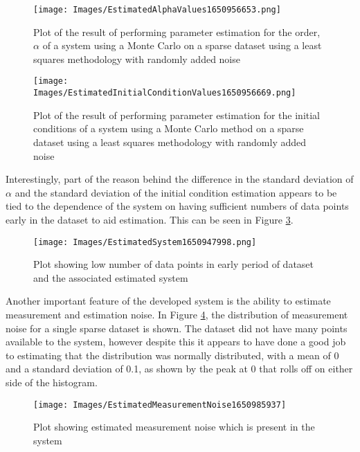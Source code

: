\begin{figure}[h]
	\centering
	\texttt{[image: Images/EstimatedAlphaValues1650956653.png]}
	\caption{Plot of the result of performing parameter estimation for the order, $\alpha$ of a system using a Monte Carlo on a sparse dataset using a least squares methodology with randomly added noise}
    \label{fig:least_squares_estimation_monte_carlo_simulation_alpha}
\end{figure}

\begin{figure}[h]
	\centering
	\texttt{[image: Images/EstimatedInitialConditionValues1650956669.png]}
	\caption{Plot of the result of performing parameter estimation for the initial conditions of a system using a Monte Carlo method on a sparse dataset using a least squares methodology with randomly added noise}
    \label{fig:least_squares_estimation_monte_carlo_simulation_x_0}
\end{figure}

Interestingly, part of the reason behind the difference in the standard deviation of $\alpha$ and the standard deviation of the initial condition estimation appears to be tied to the dependence of the system on having sufficient numbers of data points early in the dataset to aid estimation. This can be seen in Figure \ref{fig:poor_initial_condition_estimate}.

\begin{figure}[h]
	\centering
	\texttt{[image: Images/EstimatedSystem1650947998.png]}
	\caption{Plot showing low number of data points in early period of dataset and the associated estimated system}
    \label{fig:poor_initial_condition_estimate}
\end{figure}

Another important feature of the developed system is the ability to estimate measurement and estimation noise. In Figure \ref{fig:measurement_noise}, the distribution of measurement noise for a single sparse dataset is shown. The dataset did not have many points available to the system, however despite this it appears to have done a good job to estimating that the distribution was normally distributed, with a mean of 0 and a standard deviation of 0.1, as shown by the peak at 0 that rolls off on either side of the histogram. 

\begin{figure}[h]
	\centering
	\texttt{[image: Images/EstimatedMeasurementNoise1650985937]}
	\caption{Plot showing estimated measurement noise which is present in the system}
    \label{fig:measurement_noise}
\end{figure}

